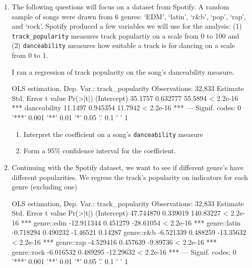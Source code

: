 \documentclass[12pt]{article}
\begin{document}
\begin{enumerate}
  \medskip
  \begin{enumerate}[label=(\alph*)]
    \item Form a 95\% confidence interval for the population mean battery life.
    Interpret this interval in words.

    \item You suspect that the average battery life is less than the advertised 7 hours.
    Test the null hypothesis that $H_0: \mu = 7$ at the 5\% significance level.
  \end{enumerate}


  \newpage
  \item The following questions will focus on a dataset from Spotify. 
  A random sample of songs were drawn from 6 genres: `EDM', `latin', `r\&b', `pop', `rap', and `rock'.
  Spotify produced a few variables we will use for the analysis: (1) \texttt{track\_popularity} measures track populartiy on a scale from 0 to 100 and (2) \texttt{danceability} measures how suitable a track is for dancing on a scale from 0 to 1.

  I ran a regression of track popularity on the song's danceability measure. 

  \begin{codeblock}[{}]
OLS estimation, Dep. Var.: track_popularity
Observations: 32,833
             Estimate Std. Error t value  Pr(>|t|)    
(Intercept)   35.1757   0.632777 55.5894 < 2.2e-16 ***
danceability  11.1497   0.945354 11.7942 < 2.2e-16 ***
---
Signif. codes:  0 '***' 0.001 '**' 0.01 '*' 0.05 '.' 0.1 ' ' 1
  \end{codeblock}

  \begin{enumerate}
    \item Interpret the coefficient on a song's \texttt{danceability} measure
    
    \item Form a 95\% confidence interval for the coefficient. 
  \end{enumerate}
  

  \newpage

  \vspace{5mm}
  \item Continuing with the Spotify dataset, we want to see if different genre's have different popularities. We regress the track's popularity on indicators for each genre (excluding one)
  \begin{codeblock}[{}]
OLS estimation, Dep. Var.: track_popularity
Observations: 32,833
               Estimate Std. Error   t value  Pr(>|t|)    
(Intercept)   47.744870   0.339019 140.83227 < 2.2e-16 ***
genre::edm   -12.911344   0.451279 -28.61054 < 2.2e-16 ***
genre::latin  -0.718294   0.490232  -1.46521   0.14287    
genre::r&b    -6.521339   0.488259 -13.35632 < 2.2e-16 ***
genre::rap    -4.529416   0.457639  -9.89736 < 2.2e-16 ***
genre::rock   -6.016532   0.489295 -12.29632 < 2.2e-16 ***
---
Signif. codes:  0 '***' 0.001 '**' 0.01 '*' 0.05 '.' 0.1 ' ' 1
  \end{codeblock}


\end{enumerate}
\end{document}
